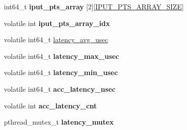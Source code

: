 {\bf }\par
\begin{DoxyCompactItemize}
\item 
int64\+\_\+t {\bfseries iput\+\_\+pts\+\_\+array} \mbox{[}2\mbox{]}\mbox{[}\hyperlink{proc_8h_af53db00bc88282285037381807cc5c1d}{I\+P\+U\+T\+\_\+\+P\+T\+S\+\_\+\+A\+R\+R\+A\+Y\+\_\+\+S\+I\+ZE}\mbox{]}\hypertarget{structproc__ctx__s_afe00d8671976a864711e0db2841c5964}{}\label{structproc__ctx__s_afe00d8671976a864711e0db2841c5964}

\item 
volatile int {\bfseries iput\+\_\+pts\+\_\+array\+\_\+idx}\hypertarget{structproc__ctx__s_a143dc31fd44936ccafe2ecdaeef20ad6}{}\label{structproc__ctx__s_a143dc31fd44936ccafe2ecdaeef20ad6}

\end{DoxyCompactItemize}

{\bf }\par
\begin{DoxyCompactItemize}
\item 
volatile int64\+\_\+t \hyperlink{structproc__ctx__s_acdd3cc73dadcf7eb7c70c6e5ffb53293}{latency\+\_\+avg\+\_\+usec}
\item 
volatile int64\+\_\+t {\bfseries latency\+\_\+max\+\_\+usec}\hypertarget{structproc__ctx__s_a5cbe8711ddd1b36a2b203cfc8ef1b01f}{}\label{structproc__ctx__s_a5cbe8711ddd1b36a2b203cfc8ef1b01f}

\item 
volatile int64\+\_\+t {\bfseries latency\+\_\+min\+\_\+usec}\hypertarget{structproc__ctx__s_a0546eedba9aabcc7edc958f1ccc8cd42}{}\label{structproc__ctx__s_a0546eedba9aabcc7edc958f1ccc8cd42}

\item 
volatile int64\+\_\+t {\bfseries acc\+\_\+latency\+\_\+nsec}\hypertarget{structproc__ctx__s_a58e7e20b896b1d74789f2fe9b971fd09}{}\label{structproc__ctx__s_a58e7e20b896b1d74789f2fe9b971fd09}

\item 
volatile int {\bfseries acc\+\_\+latency\+\_\+cnt}\hypertarget{structproc__ctx__s_a3dea6eaed00798ceac47451e5923dc41}{}\label{structproc__ctx__s_a3dea6eaed00798ceac47451e5923dc41}

\item 
pthread\+\_\+mutex\+\_\+t {\bfseries latency\+\_\+mutex}\hypertarget{structproc__ctx__s_ac9705b88786b067a17f84178d52bbce1}{}\label{structproc__ctx__s_ac9705b88786b067a17f84178d52bbce1}

\end{DoxyCompactItemize}



